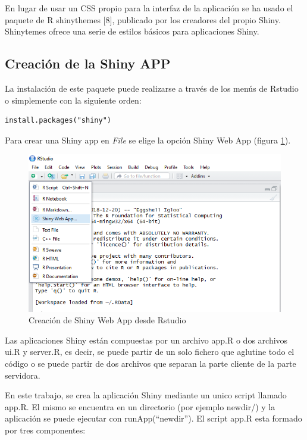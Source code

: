En lugar de usar un CSS propio para la interfaz de la aplicación se ha usado el paquete de R shinythemes [8], publicado por los creadores del propio Shiny. Shinytemes ofrece una serie de estilos básicos para aplicaciones Shiny.



\subsection{Creación de la Shiny APP}
La instalación de este paquete puede realizarse a través de los menús de Rstudio o simplemente con la siguiente orden:\\

\begin{lstlisting}
install.packages("shiny")
\end{lstlisting}

Para crear una Shiny app en \emph{File} se elige la opción Shiny Web App (figura \ref{fig:fig322}).

\begin{figure}[h]
\begin{center}
\includegraphics[width=12cm]{./Graficos/figura4}
\end{center}
\caption{Creación de Shiny Web App desde Rstudio}
\label{fig:fig322}
\end{figure}


Las aplicaciones Shiny están compuestas por un archivo app.R o dos archivos ui.R y server.R, es decir, se puede partir de un solo fichero que aglutine todo el código o se puede partir de dos archivos que separan la parte cliente de la parte servidora.

En este trabajo, se crea la aplicación Shiny mediante un unico script llamado app.R. El mismo se encuentra en un directorio (por ejemplo newdir/) y la aplicación se puede ejecutar con runApp(``newdir''). El script app.R esta formado por tres componentes:

